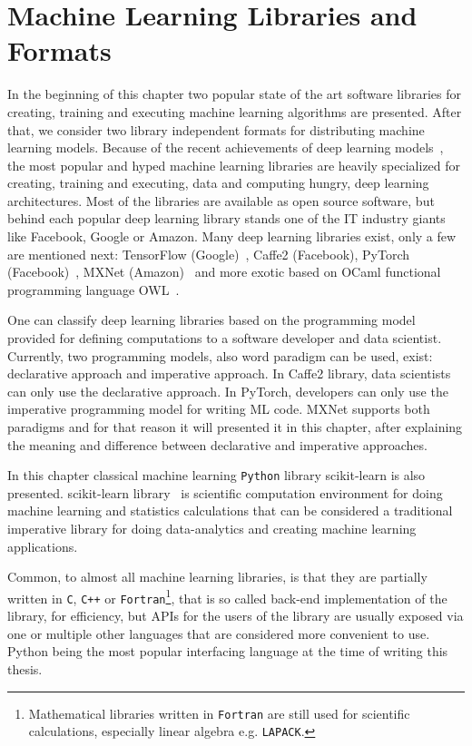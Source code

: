 \documentclass[english, 12pt, a4paper, elec, utf8, online]{aaltothesis}
\begin{document}
\newpage
\section{Machine Learning Libraries and Formats}\label{chapter:ml_practical} 
In the beginning of this chapter two popular state of the art software libraries for creating, training and executing machine learning algorithms are presented. After that, we consider two library independent formats for distributing machine learning models. Because of the recent achievements of deep learning models~\cite{tan_lim_2018}, the most popular and hyped machine learning libraries are heavily specialized for creating, training and executing, data and computing hungry, deep learning architectures. Most of the libraries are available as open source software, but behind each popular deep learning library stands one of the IT industry giants like Facebook, Google or Amazon. Many deep learning libraries exist, only a few are mentioned next: TensorFlow (Google)~\cite{abadi2016tensorflowas}, Caffe2 (Facebook), PyTorch (Facebook)~\cite{paszke2017automatic}, MXNet (Amazon)~\cite{chen2015mxnet} and more exotic based on OCaml functional programming language OWL~\cite{wang2017owl}. 

One can classify deep learning libraries based on the programming model provided for defining computations to a software developer and data scientist. Currently, two programming models, also word paradigm can be used, exist: declarative approach and imperative approach. In Caffe2 library, data scientists can only use the declarative approach. In PyTorch, developers can only use the imperative programming model for writing ML code. MXNet supports both paradigms and for that reason it will presented it in this chapter, after explaining the meaning and difference between declarative and imperative approaches. 

In this chapter classical machine learning \texttt{Python} library scikit-learn is also presented. scikit-learn library~\cite{pedregosa2011scikit} is scientific computation environment for doing machine learning and statistics calculations that can be considered a traditional imperative library for doing data-analytics and creating machine learning applications.

Common, to almost all machine learning libraries, is that they are partially written  in \texttt{C}, \texttt{C++} or \texttt{Fortran}\footnote{Mathematical libraries written in \texttt{Fortran} are still used for scientific calculations, especially linear algebra e.g. \texttt{LAPACK}.}, that is so called back-end implementation of the library, for efficiency, but APIs for the users of the library are usually exposed via one or multiple other languages that are considered more convenient to use. Python being the most popular interfacing language at the time of writing this thesis. 
\end{document}
